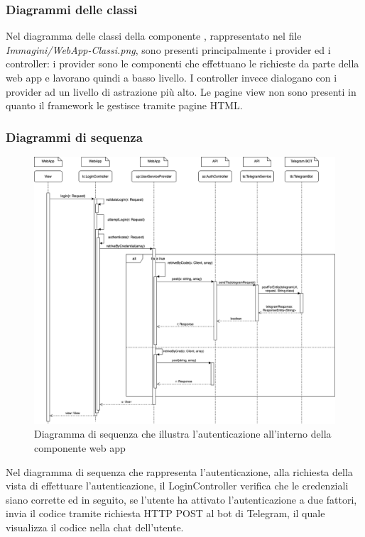 	\subsubsection{Diagrammi delle classi}%
	Nel diagramma delle classi della componente , rappresentato nel file \textit{Immagini/WebApp-Classi.png}, sono presenti principalmente i provider ed i controller: i provider sono le componenti che effettuano le richieste  da parte della web app e lavorano quindi a basso livello.
	\newline
	I controller invece dialogano con i provider ad un livello di astrazione più alto. Le pagine view non sono presenti in quanto il framework  le gestisce tramite pagine HTML.
	\begin{landscape}
	\subsubsection{Diagrammi di sequenza}%
		\begin{figure}[H]
			\centering
			\includegraphics[scale=0.400]{res/images/WEBAPP/AutenticazioneTfa.png}
			\caption{Diagramma di sequenza che illustra l'autenticazione all'interno della componente web app}
			\label{Diagramma 23}
		\end{figure}
		Nel diagramma di sequenza che rappresenta l'autenticazione, alla richiesta della vista di effettuare l'autenticazione, il LoginController verifica che le credenziali siano corrette ed in seguito, se l'utente ha attivato l'autenticazione a due fattori, invia il codice tramite richiesta HTTP POST al bot di Telegram, il quale visualizza il codice nella chat dell'utente.

\end{landscape}
